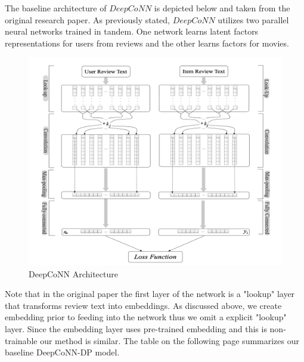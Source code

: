 \documentclass[10pt,twocolumn,letterpaper]{article}
\begin{document}
The baseline architecture of $DeepCoNN$ is depicted below and taken from the original research paper. As previously stated, $DeepCoNN$ utilizes  two parallel neural networks trained in tandem. One network learns latent factors representations for users from reviews and the other learns factors for movies. \\

\begin{figure}[!ht]
\begin{center}
\includegraphics[scale=0.40]{DeepCoNN}
\caption{DeepCoNN Architecture}
\end{center}
\end{figure}

Note that in the original paper the first layer of the network is a "lookup" layer that transforms review text into embeddings. As discussed above, we create embedding prior to feeding into the network thus we omit a explicit "lookup" layer. Since the embedding layer uses pre-trained embedding and this is non-trainable our method is similar. The table on the following page summarizes our baseline DeepCoNN-DP model.  
\end{document}
